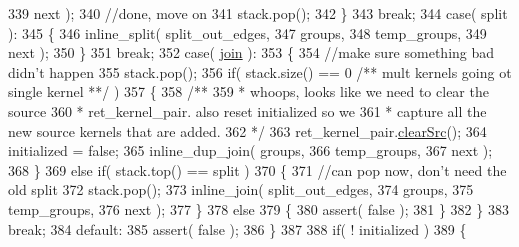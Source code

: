 \begin{DoxyCode}
339                              next );
340                 \textcolor{comment}{//done, move on}
341                 stack.pop();
342             \}
343             \textcolor{keywordflow}{break};
344             \textcolor{keywordflow}{case}( split ):
345             \{
346                 inline\_split( split\_out\_edges,
347                               groups,
348                               temp\_groups,
349                               next );
350             \}
351             \textcolor{keywordflow}{break};
352             \textcolor{keywordflow}{case}( \hyperlink{class_map_base_a2624d7b81f0078dcc78e524045403e28}{join} ):
353             \{
354                 \textcolor{comment}{//make sure something bad didn't happen}
355                 stack.pop();
356                 \textcolor{keywordflow}{if}( stack.size() == 0  \textcolor{comment}{/** mult kernels going ot single kernel **/} )
357                 \{\textcolor{comment}{}
358 \textcolor{comment}{                    /** }
359 \textcolor{comment}{                     * whoops, looks like we need to clear the source }
360 \textcolor{comment}{                     * ret\_kernel\_pair. also reset initialized so we }
361 \textcolor{comment}{                     * capture all the new source kernels that are added.}
362 \textcolor{comment}{                     */}
363                     ret\_kernel\_pair.\hyperlink{classkernel__pair__t_a853076440144fbb3c5a3524536a46336}{clearSrc}();
364                     initialized = \textcolor{keyword}{false};
365                     inline\_dup\_join( groups,
366                                      temp\_groups,
367                                      next );
368                 \}
369                 \textcolor{keywordflow}{else} \textcolor{keywordflow}{if}( stack.top() == split )
370                 \{
371                     \textcolor{comment}{//can pop now, don't need the old split}
372                     stack.pop();
373                     inline\_join( split\_out\_edges,
374                                  groups,
375                                  temp\_groups,
376                                  next );
377                 \}
378                 \textcolor{keywordflow}{else}
379                 \{
380                     assert( \textcolor{keyword}{false} );
381                 \}
382             \}
383             \textcolor{keywordflow}{break};
384             \textcolor{keywordflow}{default}:
385                 assert( \textcolor{keyword}{false} );
386         \}
387 
388         \textcolor{keywordflow}{if}( ! initialized )
389         \{

\end{DoxyCode}

